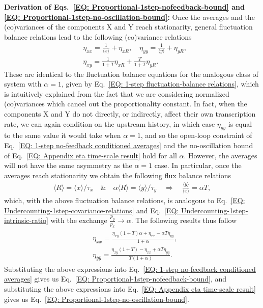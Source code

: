 \documentclass[%
 reprint,prx,
superscriptaddress,
%
%
%
%
%
%
%
%
%
 amsmath,amssymb,
 aps,
%
%
%
%
%
%
]{revtex4-2}
\newcommand{\lb}{\langle}
\newcommand{\rb}{\rangle}
\newlength{\arrow}
\begin{document}
{{\noindent \textbf{Derivation of Eqs.~\eqref{EQ: Proportional-1step-nofeedback-bound} and \eqref{EQ: Proportional-1step-no-oscillation-bound}:} Once the averages and the (co)variances of the components X and Y reach stationarity, general fluctuation balance relations \cite{hilfinger2015a} lead to the following (co)variance relations
\begin{align*}
 &\eta_{xx} = \frac{1}{\lb x \rb} + \eta_{xR} ,\quad \eta_{yy} = \frac{1}{\lb y \rb} + \eta_{yR},   \\ &\eta_{xy} = \frac{1}{1+T}\eta_{xR}  + \frac{T}{1+T}\eta_{yR} . 
\end{align*}
These are identical to the fluctuation balance equations for the analogous class of system with $\alpha = 1$, given by Eq.~\eqref{EQ: 1-step fluctuation-balance relations}, which is intuitively explained from the fact that we are considering 
normalized (co)variances which cancel out the proportionality constant. In fact, when the components X and Y do not directly, or indirectly, affect their own transcription rate, we can again condition on the upstream history, in which case $\eta_{\bar{y}\bar{y}}$ is 
equal to the same value it would take when $\alpha = 1$, and so the open-loop constraint of Eq.~\eqref{EQ: 1-step no-feedback conditioned averages} and the no-oscillation bound of Eq.~\eqref{EQ: Appendix eta time-scale result} hold for all $\alpha$. However, the averages will not have the same asymmetry as the $\alpha = 1$ case. In particular, once the averages reach stationarity we obtain the following flux balance relations \cite{hilfinger2015a}
\begin{align}
 \langle R \rangle = \langle x \rangle/\tau_{x} \quad \text{\&} \quad \alpha \langle R \rangle = \langle y \rangle /\tau_{y}  \quad \Rightarrow \quad 
 \frac{\langle y \rangle}{\langle x \rangle} = \alpha T ,
 \label{EQ: Proportional-1step-intrinsic-ratio}
\end{align}
which, with the above fluctuation balance relations, is analogous to Eq.~\eqref{EQ: Undercounting-1step-covariance-relations} and Eq.~\eqref{EQ: Undercounting-1step-intrinsic-ratio} with the exchange $\frac{p_{y}}{p_{x}} \to \alpha$. The following results thus follow 
\begin{align}
    \begin{split}
   &\eta_{\bar{x}\bar{x}} = \frac{\eta_{xy}(1+T)\alpha + \eta_{xx} - \alpha T\eta_{yy}}{1+\alpha }, \\
   &\eta_{\bar{y}\bar{y}} = \frac{\eta_{xy}(1+T) - \eta_{xx} + \alpha T\eta_{yy}}{T\left(1+\alpha \right)} .
   \end{split}
   \label{EQ: Proportional-rates-1step-extrinsic-noise}
\end{align}
Substituting the above expressions into Eq.~\eqref{EQ: 1-step no-feedback conditioned averages} gives us Eq.~\eqref{EQ: Proportional-1step-nofeedback-bound}, and substituting the above expressions into Eq.~\eqref{EQ: Appendix eta time-scale result} gives us Eq.~\eqref{EQ: Proportional-1step-no-oscillation-bound}.




}}
\end{document}
